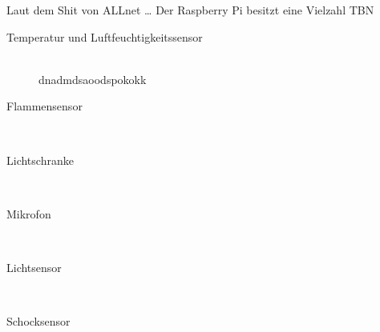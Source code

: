 
Laut dem Shit von ALLnet \cite{111861pd90} \ldots
Der Raspberry Pi besitzt eine Vielzahl  TBN

\begin{description}
\item[Temperatur und Luftfeuchtigkeitssensor] \hfill \\
	dnadmdsaoodspokokk
\item[Flammensensor]\hfill \\
\item[Lichtschranke]\hfill \\
\item[Mikrofon]\hfill \\
\item[Lichtsensor]\hfill \\
\item[Schocksensor]\hfill \\
\end{description}